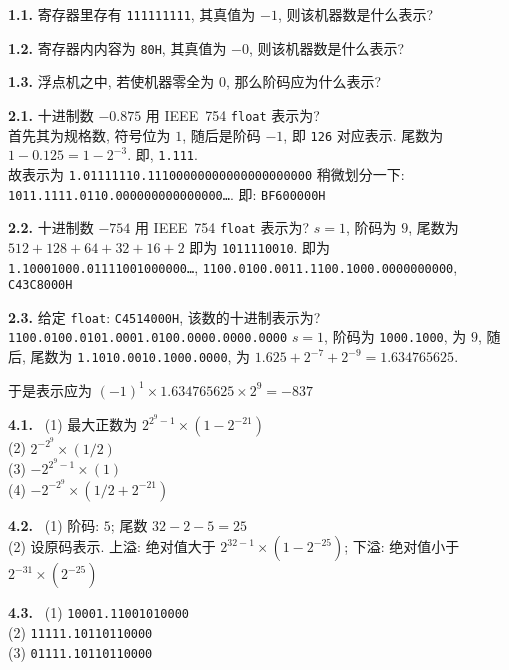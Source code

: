 \documentclass[12pt]{ctexart}
\theoremstyle{definition}
\theoremstyle{definition}
\theoremstyle{plain}
\theoremstyle{remark}
\begin{document}
\setlength{\hangindent}{30pt}
\noindent
\textbf{1.1. } 寄存器里存有 \texttt{111111111}, 其真值为 \(-1\), 则该机器数是什么表示?

\setlength{\hangindent}{30pt}
\noindent
\textbf{1.2. } 寄存器内内容为 \texttt{80H}, 其真值为 \(-0\), 则该机器数是什么表示?

\setlength{\hangindent}{30pt}
\noindent
\textbf{1.3. } 浮点机之中, 若使机器零全为 \(0\), 那么阶码应为什么表示? 

\setlength{\hangindent}{30pt}
\noindent
\textbf{2.1. } 十进制数 \(-0.875\) 用 IEEE~754 \verb|float| 表示为?\\
首先其为规格数, 符号位为 \(1\), 随后是阶码 \(-1\), 即 \texttt{126} 对应表示. 尾数为 \(1 - 0.125 = 1 - 2 ^{-3}\). 
即, \texttt{1.111}. \\
故表示为 \texttt{1.01111110.11100000000000000000000}
稍微划分一下: \\ \texttt{1011.1111.0110.000000000000000\dots}. 即: \texttt{BF600000H}

\setlength{\hangindent}{30pt}
\noindent
\textbf{2.2. } 十进制数 \(-754\) 用 IEEE~754 \verb|float| 表示为? 
\(s = 1\), 阶码为 \(9\), 尾数为 \(512 + 128 +  64 +  32 + 16 + 2\) 即为 \texttt{1011110010}. 
即为 
\texttt{1.10001000.01111001000000\dots}, \texttt{1100.0100.0011.1100.1000.0000000000}, \texttt{C43C8000H}


\setlength{\hangindent}{30pt}
\noindent
\textbf{2.3. } 给定 \verb|float|: \verb|C4514000H|, 该数的十进制表示为? 
\texttt{1100.0100.0101.0001.0100.0000.0000.0000}
\(s = 1\), 阶码为 \texttt{1000.1000}, 为 \(9\), 随后, 尾数为 \texttt{1.1010.0010.1000.0000}, 为 \(1.625 + 2 ^{-7} + 2 ^{-9} = 1.634765625\). 

于是表示应为 \((-1) ^{1} \times 1.634765625 \times 2 ^{9}= -837\)


\setlength{\hangindent}{30pt}
\noindent
\textbf{4.1.} \ (1) 最大正数为 \(2 ^{2 ^{9} - 1} \times (1 - 2 ^{-21})\)  \\
(2) \(2 ^{- 2 ^{9}} \times (1/2)\) \\
(3) \(-2 ^{2 ^{9} - 1} \times (1)\)\\
(4) \(-2 ^{ - 2^{9} } \times (1/2 + 2 ^{-21})\)

\setlength{\hangindent}{30pt}
\noindent
\textbf{4.2.} \ (1) 阶码: \(5\); 尾数 \(32 - 2 - 5 = 25\) \\ 
(2) 设原码表示. 上溢: 绝对值大于 \(2 ^{32 - 1} \times (1 - 2 ^{-25})\); 下溢: 绝对值小于 \(2 ^{-31} \times (2 ^{-25})\)

\setlength{\hangindent}{30pt}
\noindent
\textbf{4.3.} \
(1) 
\texttt{10001.11001010000}\\
(2) \texttt{11111.10110110000}\\
(3) \texttt{01111.10110110000}
\end{document}

